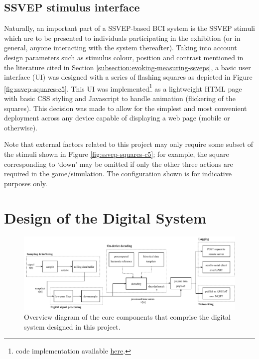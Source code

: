 \subsection{SSVEP stimulus interface}

Naturally, an important part of a SSVEP-based BCI system is the SSVEP stimuli which are to be presented to individuals participating in the exhibition (or in general, anyone interacting with the system thereafter). Taking into account design parameters such as stimulus colour, position and contrast mentioned in the literature cited in Section \ref{subsection:evoking-measuring-ssveps}, a basic user interface (UI) was designed with a series of flashing squares as depicted in Figure \ref{fig:ssvep-squares-c5}. This UI was implemented\footnote{code implementation available \href{https://github.com/JamesTev/EEG-decoding/blob/master/ui/ssvep_squares.html}{here}.} as a lightweight HTML page with basic CSS styling and Javascript to handle animation (flickering of the squares). This decision was made to allow for the simplest and most convenient deployment across any device capable of displaying a web page (mobile or otherwise). 

Note that external factors related to this project may only require some subset of the stimuli shown in Figure \ref{fig:ssvep-squares-c5}; for example, the square corresponding to `down' may be omitted if only the other three actions are required in the game/simulation. The configuration shown is for indicative purposes only.

\section{Design of the Digital System}
\begin{figure}[!htb]
    \centering
    \includegraphics[width=\textwidth]{digital-system-overview}
    \caption{Overview diagram of the core components that comprise the digital system designed in this project.}
    \label{fig:digital-system-overview-c5}
\end{figure}


